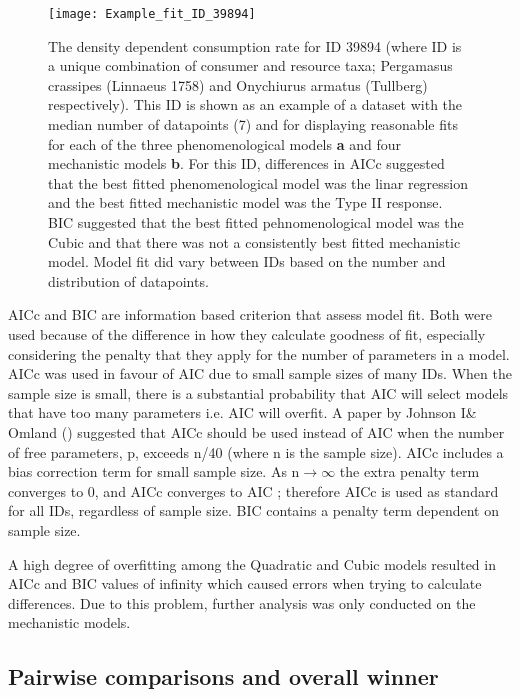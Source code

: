 \documentclass[11pt]{article}
\begin{document}
            \begin{figure}[htpb]
                \texttt{[image: Example\_fit\_ID\_39894]}\label{fig:1}
                \centering
                \caption{The density dependent consumption rate for ID 39894 (where ID is a unique combination of consumer and resource taxa; Pergamasus crassipes (Linnaeus 1758) and Onychiurus armatus (Tullberg) respectively). This ID is shown as an example of a dataset with the median number of datapoints (7) and for displaying reasonable fits for each of the three phenomenological models \textbf{a} and four mechanistic models \textbf{b}. For this ID, differences in AICc suggested that the best fitted phenomenological model was the linar regression and the best fitted mechanistic model was the Type II response. BIC suggested that the best fitted pehnomenological model was the Cubic and that there was not a consistently best fitted mechanistic model. Model fit did vary between IDs based on the number and distribution of datapoints.}
            \end{figure}
            
            AICc and BIC are information based criterion that assess model fit. Both were used because of the difference in how they calculate goodness of fit, especially considering the penalty that they apply for the number of parameters in a model. AICc was used in favour of AIC due to small sample sizes of many IDs. When the sample size is small, there is a substantial probability that AIC will select models that have too many parameters i.e. AIC will overfit. A paper by Johnson I\& Omland (\citep{johnson2004model}) suggested that AICc should be used instead of AIC when the number of free parameters, p, exceeds n/40 (where n is the sample size). AICc includes a bias correction term for small sample size. As \(\text{n} \rightarrow \text{$\infty$}\) the extra penalty term converges to 0, and AICc converges to AIC \citep{burnhamandanderson2004}; therefore AICc is used as standard for all IDs, regardless of sample size. BIC contains a penalty term dependent on sample size.

            A high degree of overfitting among the Quadratic and Cubic models resulted in AICc and BIC values of infinity which caused errors when trying to calculate differences. Due to this problem, further analysis was only conducted on the mechanistic models.


        \subsection{Pairwise comparisons and overall winner}
            
\end{document}
